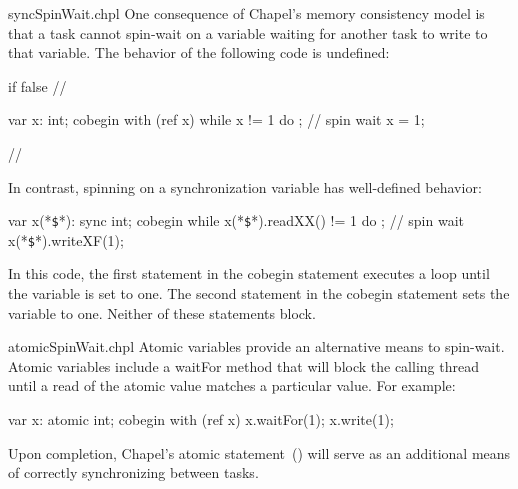 \begin{chapelexample}{syncSpinWait.chpl}
One consequence of Chapel's memory consistency model is that a task cannot spin-wait on a
variable waiting for another task to write to that variable.  The behavior of
the following code is undefined:

\begin{chapelpre}
if false { // }
\end{chapelpre}
\begin{chapel}
var x: int;
cobegin with (ref x) {
  while x != 1 do ;  // spin wait
  x = 1;
}
\end{chapel}
\begin{chapelnoprint}
// {
}
\end{chapelnoprint}
In contrast, spinning on a synchronization variable has well-defined
behavior:
\begin{chapel}
var x(*\texttt{\$}*): sync int;
cobegin {
  while x(*\texttt{\$}*).readXX() != 1 do ;  // spin wait
  x(*\texttt{\$}*).writeXF(1);
}
\end{chapel}
\begin{chapeloutput}
\end{chapeloutput}

In this code, the first statement in the cobegin statement executes a
loop until the variable is set to one.  The second statement in the
cobegin statement sets the variable to one.  Neither of these
statements block.
\end{chapelexample}

\begin{chapelexample}{atomicSpinWait.chpl}
Atomic variables provide an alternative means to spin-wait. Atomic variables include a waitFor method that will block the calling thread until a read of the atomic value matches a particular value. For example:

\begin{chapel}
var x: atomic int;
cobegin with (ref x) {
  x.waitFor(1);
  x.write(1);
}
\end{chapel}
\begin{chapeloutput}
\end{chapeloutput}

\end{chapelexample}


\begin{future}
Upon completion, Chapel's atomic statement~() will serve as
an additional means of correctly synchronizing between tasks.
\end{future}

